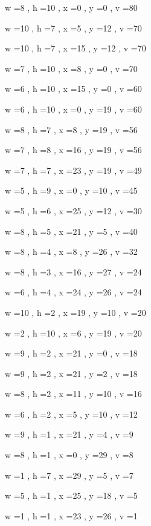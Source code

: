 \documentclass[11pt]{article}
\begin{document}
w =8 , h =10 , x =0 , y =0 , v =80
\par
w =10 , h =7 , x =5 , y =12 , v =70
\par
w =10 , h =7 , x =15 , y =12 , v =70
\par
w =7 , h =10 , x =8 , y =0 , v =70
\par
w =6 , h =10 , x =15 , y =0 , v =60
\par
w =6 , h =10 , x =0 , y =19 , v =60
\par
w =8 , h =7 , x =8 , y =19 , v =56
\par
w =7 , h =8 , x =16 , y =19 , v =56
\par
w =7 , h =7 , x =23 , y =19 , v =49
\par
w =5 , h =9 , x =0 , y =10 , v =45
\par
w =5 , h =6 , x =25 , y =12 , v =30
\par
w =8 , h =5 , x =21 , y =5 , v =40
\par
w =8 , h =4 , x =8 , y =26 , v =32
\par
w =8 , h =3 , x =16 , y =27 , v =24
\par
w =6 , h =4 , x =24 , y =26 , v =24
\par
w =10 , h =2 , x =19 , y =10 , v =20
\par
w =2 , h =10 , x =6 , y =19 , v =20
\par
w =9 , h =2 , x =21 , y =0 , v =18
\par
w =9 , h =2 , x =21 , y =2 , v =18
\par
w =8 , h =2 , x =11 , y =10 , v =16
\par
w =6 , h =2 , x =5 , y =10 , v =12
\par
w =9 , h =1 , x =21 , y =4 , v =9
\par
w =8 , h =1 , x =0 , y =29 , v =8
\par
w =1 , h =7 , x =29 , y =5 , v =7
\par
w =5 , h =1 , x =25 , y =18 , v =5
\par
w =1 , h =1 , x =23 , y =26 , v =1
\par
\newpage


\end{document}

